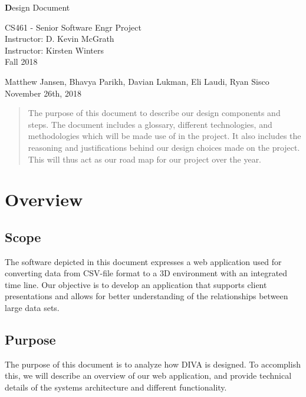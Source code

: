\documentclass[journal,10pt,onecolumn,compsoc]{IEEEtran} \usepackage[margin=1.0in]{geometry} \usepackage{pdfpages}
\begin{document}
\begin{center}
  
  \textbf{}

  \vspace{2.5cm}
  \Huge{}
  \textbf Design Document
  \vspace{1.5cm}

 
  \LARGE
  CS461 - Senior Software Engr Project\\
  \vspace{0.25cm}
  Instructor: D. Kevin McGrath \\
  Instructor: Kirsten Winters \\
  \vspace{0.25cm}
  Fall 2018 \\
  \vspace{1cm}
  
  \large{Matthew Jansen, Bhavya Parikh, Davian Lukman, Eli Laudi, Ryan Sisco}\\
  \vfill
  November 26th, 2018\\
  \vspace{1cm}
  \vspace*{\fill}
   \begin{abstract}
      The purpose of this document to describe our design components and steps. The document includes a glossary, different technologies, and methodologies which will be made use of in the project. It also includes the reasoning and justifications behind our design choices made on the project. This will thus act as our road map  for our project over the year.
       \noindent 
   \end{abstract}
   \normalsize 
  \end{center}
\newpage
\tableofcontents
\newpage

\section{Overview}
    \subsection{Scope}
    The software depicted in this document expresses a web application used for converting data from CSV-file format to a 3D environment with an integrated time line. Our objective is to develop an application that supports client presentations and allows for better understanding of the relationships between large data sets.
    \subsection{Purpose}
    The purpose of this document is to analyze how DIVA is designed. To accomplish this, we will describe an overview of our web application, and provide technical details of the systems architecture and different functionality.  
\end{document}
